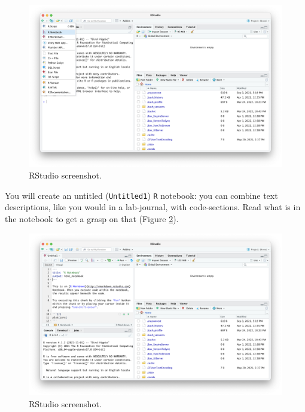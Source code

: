 \documentclass[
]{book}
\newcommand{\passthrough}[1]{#1}
\begin{document}
\begin{figure}

{\centering \includegraphics[width=34.5in]{img/rstudio-screenshot-create-notebook} 

}

\caption{RStudio screenshot.}\label{fig:rstudio-screenshot-create-notebook}
\end{figure}

You will create an untitled (\passthrough{\lstinline!Untitled1!}) \passthrough{\lstinline!R!} notebook: you can combine text descriptions, like you would in a lab-journal, with code-sections. Read what is in the notebook to get a grasp on that (Figure \ref{fig:rstudio-screenshot-notebook}).

\begin{figure}

{\centering \includegraphics[width=34.5in]{img/rstudio-screenshot-notebook} 

}

\caption{RStudio screenshot.}\label{fig:rstudio-screenshot-notebook}
\end{figure}
\end{document}
